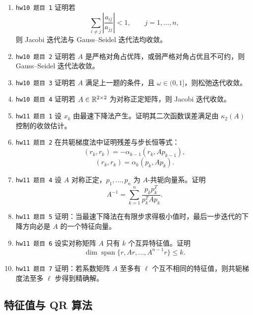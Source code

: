 \documentclass{article}
\begin{document}
\begin{enumerate}
  \item \texttt{hw10 题目 1} 证明若
  \[
    \sum_{i\ne j}\left|\frac{a_{ij}}{a_{jj}}\right|<1,\qquad j=1,\ldots,n,
  \]
  则 Jacobi 迭代法与 Gauss--Seidel 迭代法均收敛。

  \item \texttt{hw10 题目 2} 证明若 $A$ 是严格对角占优阵，或弱严格对角占优且不可约，则 Gauss--Seidel 迭代法收敛。

  \item \texttt{hw10 题目 3} 证明若 $A$ 满足上一题的条件，且 $\omega\in(0,1]$，则松弛迭代收敛。

  \item \texttt{hw10 题目 4} 证明若 $A\in\mathbb{R}^{2\times2}$ 为对称正定矩阵，则 Jacobi 迭代收敛。

  \item \texttt{hw11 题目 1} 设 $x_k$ 由最速下降法产生。证明其二次函数误差满足由 $\kappa_2(A)$ 控制的收敛估计。

  \item \texttt{hw11 题目 2} 在共轭梯度法中证明残差与步长恒等式：
  \[
    (r_k,r_k)=-\alpha_{k-1}(r_k,Ap_{k-1}),
  \]
  \[
    (r_k,r_k)=\alpha_k(p_k,Ap_k).
  \]

  \item \texttt{hw11 题目 4} 设 $A$ 对称正定，$p_1,\dots,p_n$ 为 $A$-共轭向量系。证明
  \[
    A^{-1}=\sum_{k=1}^n\frac{p_kp_k^T}{p_k^TAp_k}.
  \]

  \item \texttt{hw11 题目 5} 证明：当最速下降法在有限步求得极小值时，最后一步迭代的下降方向必是 $A$ 的一个特征向量。

  \item \texttt{hw11 题目 6} 设实对称矩阵 $A$ 只有 $k$ 个互异特征值。证明
  \[
    \dim\operatorname{span}\{r,Ar,\dots,A^{n-1}r\}\le k.
  \]

  \item \texttt{hw11 题目 7} 证明：若系数矩阵 $A$ 至多有 $\ell$ 个互不相同的特征值，则共轭梯度法至多 $\ell$ 步得到精确解。
\end{enumerate}

\subsection{特征值与 QR 算法}
\end{document}
